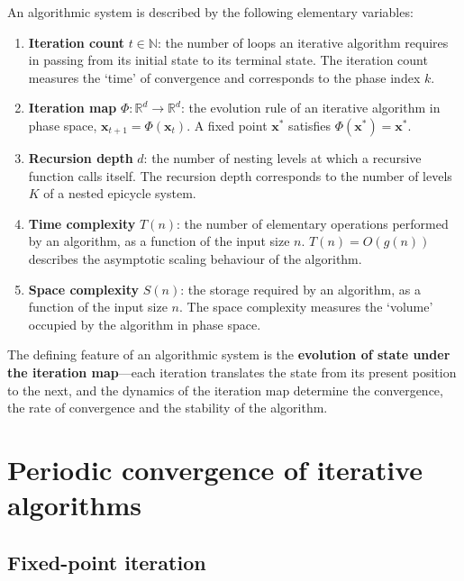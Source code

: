 \begin{definition}\label{def:algorithm_quantities}
An algorithmic system is described by the following elementary variables:
\begin{enumerate}[label=(\roman*)]
    \item \textbf{Iteration count} $t \in \mathbb{N}$: the number of loops an iterative algorithm requires in passing from its initial state to its terminal state. The iteration count measures the `time' of convergence and corresponds to the phase index $k$.
    \item \textbf{Iteration map} $\Phi: \mathbb{R}^d \to \mathbb{R}^d$: the evolution rule of an iterative algorithm in phase space, $\mathbf{x}_{t+1} = \Phi(\mathbf{x}_t)$. A fixed point $\mathbf{x}^*$ satisfies $\Phi(\mathbf{x}^*) = \mathbf{x}^*$.
    \item \textbf{Recursion depth} $d$: the number of nesting levels at which a recursive function calls itself. The recursion depth corresponds to the number of levels $K$ of a nested epicycle system.
    \item \textbf{Time complexity} $T(n)$: the number of elementary operations performed by an algorithm, as a function of the input size $n$. $T(n) = O(g(n))$ describes the asymptotic scaling behaviour of the algorithm.
    \item \textbf{Space complexity} $S(n)$: the storage required by an algorithm, as a function of the input size $n$. The space complexity measures the `volume' occupied by the algorithm in phase space.
\end{enumerate}
The defining feature of an algorithmic system is the \textbf{evolution of state under the iteration map}---each iteration translates the state from its present position to the next, and the dynamics of the iteration map determine the convergence, the rate of convergence and the stability of the algorithm.
\end{definition}

\section{Periodic convergence of iterative algorithms}

\subsection{Fixed-point iteration}

